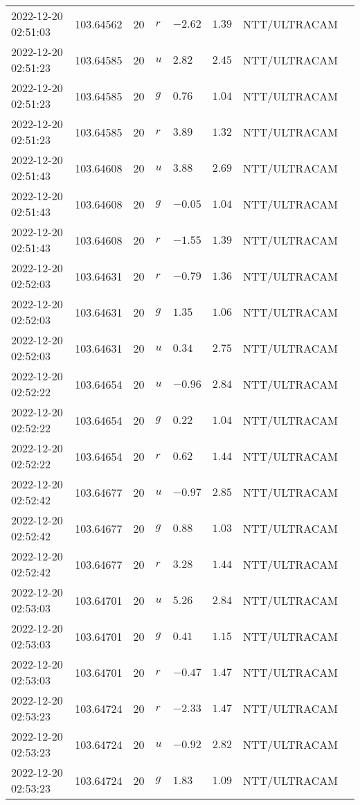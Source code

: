 \documentclass{nature_plusfigure}
\begin{document}
\begin{supplement}
\begin{center}
\begin{longtable}{llllllll}
2022-12-20 02:51:03 & 103.64562 & 20 & $r$ & $-2.62$ & $1.39$ & NTT/ULTRACAM &  \\ 
2022-12-20 02:51:23 & 103.64585 & 20 & $u$ & $2.82$ & $2.45$ & NTT/ULTRACAM &  \\ 
2022-12-20 02:51:23 & 103.64585 & 20 & $g$ & $0.76$ & $1.04$ & NTT/ULTRACAM &  \\ 
2022-12-20 02:51:23 & 103.64585 & 20 & $r$ & $3.89$ & $1.32$ & NTT/ULTRACAM &  \\ 
2022-12-20 02:51:43 & 103.64608 & 20 & $u$ & $3.88$ & $2.69$ & NTT/ULTRACAM &  \\ 
2022-12-20 02:51:43 & 103.64608 & 20 & $g$ & $-0.05$ & $1.04$ & NTT/ULTRACAM &  \\ 
2022-12-20 02:51:43 & 103.64608 & 20 & $r$ & $-1.55$ & $1.39$ & NTT/ULTRACAM &  \\ 
2022-12-20 02:52:03 & 103.64631 & 20 & $r$ & $-0.79$ & $1.36$ & NTT/ULTRACAM &  \\ 
2022-12-20 02:52:03 & 103.64631 & 20 & $g$ & $1.35$ & $1.06$ & NTT/ULTRACAM &  \\ 
2022-12-20 02:52:03 & 103.64631 & 20 & $u$ & $0.34$ & $2.75$ & NTT/ULTRACAM &  \\ 
2022-12-20 02:52:22 & 103.64654 & 20 & $u$ & $-0.96$ & $2.84$ & NTT/ULTRACAM &  \\ 
2022-12-20 02:52:22 & 103.64654 & 20 & $g$ & $0.22$ & $1.04$ & NTT/ULTRACAM &  \\ 
2022-12-20 02:52:22 & 103.64654 & 20 & $r$ & $0.62$ & $1.44$ & NTT/ULTRACAM &  \\ 
2022-12-20 02:52:42 & 103.64677 & 20 & $u$ & $-0.97$ & $2.85$ & NTT/ULTRACAM &  \\ 
2022-12-20 02:52:42 & 103.64677 & 20 & $g$ & $0.88$ & $1.03$ & NTT/ULTRACAM &  \\ 
2022-12-20 02:52:42 & 103.64677 & 20 & $r$ & $3.28$ & $1.44$ & NTT/ULTRACAM &  \\ 
2022-12-20 02:53:03 & 103.64701 & 20 & $u$ & $5.26$ & $2.84$ & NTT/ULTRACAM &  \\ 
2022-12-20 02:53:03 & 103.64701 & 20 & $g$ & $0.41$ & $1.15$ & NTT/ULTRACAM &  \\ 
2022-12-20 02:53:03 & 103.64701 & 20 & $r$ & $-0.47$ & $1.47$ & NTT/ULTRACAM &  \\ 
2022-12-20 02:53:23 & 103.64724 & 20 & $r$ & $-2.33$ & $1.47$ & NTT/ULTRACAM &  \\ 
2022-12-20 02:53:23 & 103.64724 & 20 & $u$ & $-0.92$ & $2.82$ & NTT/ULTRACAM &  \\ 
2022-12-20 02:53:23 & 103.64724 & 20 & $g$ & $1.83$ & $1.09$ & NTT/ULTRACAM &  \\ 

\end{longtable}
\end{center}
\end{supplement}
\end{document}
